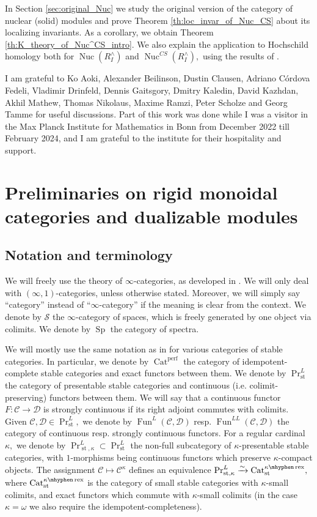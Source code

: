 \documentclass[11pt,leqno]{amsart}
\numberwithin{equation}{section}
\newcommand{\hy}{\mhyphen}
\newcommand{\xto}{\xrightarrow}
\newcommand{\rex}{\operatorname{rex}}
\newcommand{\Nuc}{\operatorname{Nuc}}
\newcommand{\Cat}{\operatorname{Cat}}
\newcommand{\st}{\operatorname{st}}
\newcommand{\cD}{{\mathcal D}}
\newcommand{\cC}{{\mathcal C}}
\newcommand{\cS}{{\mathcal S}}
\newcommand{\Fun}{\operatorname{Fun}}
\newcommand{\perf}{\operatorname{perf}}
\newcommand{\Sp}{\operatorname{Sp}}
\begin{document}
In Section \ref{sec:original_Nuc} we study the original version of the category of nuclear (solid) modules and prove Theorem \ref{th:loc_invar_of_Nuc_CS} about its localizing invariants. As a corollary, we obtain Theorem \ref{th:K_theory_of_Nuc^CS_intro}. We also explain the application to Hochschild homology both for $\Nuc(R^{\wedge}_I)$ and $\Nuc^{CS}(R^{\wedge}_I),$ using the results of \cite{Cor}. 

{} I am grateful to Ko Aoki, Alexander Beilinson, Dustin Clausen, Adriano C\'ordova Fedeli, Vladimir Drinfeld, Dennis Gaitsgory, Dmitry Kaledin, David Kazhdan, Akhil Mathew, Thomas Nikolaus, Maxime Ramzi, Peter Scholze and Georg Tamme for useful discussions. Part of this work was done while I was a visitor in the Max Planck Institute for Mathematics in Bonn from December 2022 till February 2024, and I am grateful to the institute for their hospitality and support.  

\section{Preliminaries on rigid monoidal categories and dualizable modules}
\label{sec:preliminaries_rigid_and_dualizable}

\subsection{Notation and terminology}

We will freely use the theory of $\infty$-categories, as developed in \cite{Lur09, Lur17}. We will only deal with $(\infty,1)$-categories, unless otherwise stated. Moreover, we will simply say ``category'' instead of ``$\infty$-category'' if the meaning is clear from the context. We denote by $\cS$ the $\infty$-category of spaces, which is freely generated by one object via colimits. We denote by $\Sp$ the category of spectra.

We will mostly use the same notation as in \cite{E24} for various categories of stable categories. In particular, we denote by $\Cat^{\perf}$ the category of idempotent-complete stable categories and exact functors between them. We denote by $\Pr^L_{\st}$ the category of presentable stable categories and continuous (i.e. colimit-preserving) functors between them. We will say that a continuous functor $F:\cC\to\cD$ is strongly continuous if its right adjoint commutes with colimits. Given $\cC,\cD\in\Pr^L_{\st},$ we denote by $\Fun^L(\cC,\cD)$ resp. $\Fun^{LL}(\cC,\cD)$ the category of continuous resp. strongly continuous functors. For a regular cardinal $\kappa,$ we denote by $\Pr^L_{\st,\kappa}\subset \Pr^L_{\st}$ the non-full subcategory of $\kappa$-presentable stable categories, with $1$-morphisms being continuous functors which preserve $\kappa$-compact objects. The assignment $\cC\mapsto \cC^{\kappa}$ defines an equivalence $\Pr^L_{\st,\kappa}\xto{\sim}\Cat^{\kappa\hy\rex}_{\st},$ where $\Cat^{\kappa\hy\rex}_{\st}$ is the category of small stable categories with $\kappa$-small colimits, and exact functors which commute with $\kappa$-small colimits (in the case $\kappa=\omega$ we also require the idempotent-completeness).
\end{document}
